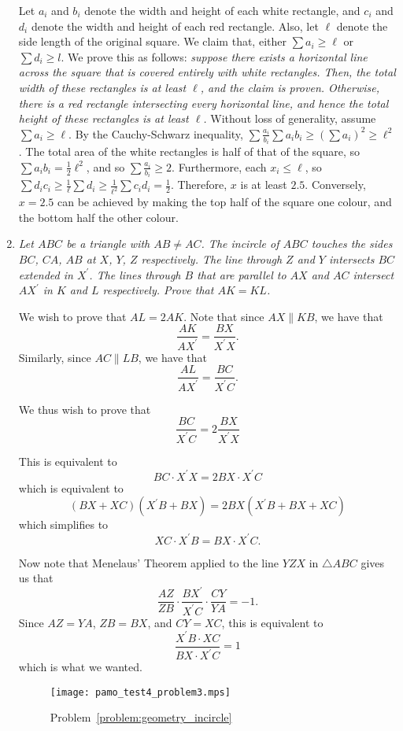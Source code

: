 \documentclass[a4paper, 12pt]{article}
\begin{document}
\begin{enumerate}
Let $a_i$ and $b_i$ denote the width and height of each white rectangle, and $c_i$ and $d_i$ denote the width and height of each red rectangle. Also, let $\ell$ denote the side length of the original square. We claim that, either $\sum a_i \geq \ell$ or $\sum d_i \geq l$. We prove this as follows: \textit{suppose there exists a horizontal line across the square that is covered entirely with white rectangles. Then, the total width of these rectangles is at least $\ell$, and the claim is proven. Otherwise, there is a red rectangle intersecting every horizontal line, and hence the total height of these rectangles is at least $\ell$.} Without loss of generality, assume $\sum a_i \geq \ell$. By the Cauchy-Schwarz inequality, $\sum \frac{a_i}{b_i} \sum{a_i b_i} \geq {(\sum a_i)}^2 \geq \ell^2$. The total area of the white rectangles is half of that of the square, so $\sum a_i b_i = \frac{1}{2} \ell^2$, and so $\sum \frac{a_i}{b_i} \geq 2$. Furthermore, each $x_i \leq \ell$, so $\sum{d_i}{c_i} \geq \frac{1}{\ell} \sum d_i \geq \frac{1}{\ell^2} \sum c_i d_i = \frac{1}{2}$. Therefore, $x$ is at least $2.5$. Conversely, $x = 2.5$ can be achieved by making the top half of the square one colour, and the bottom half the other colour.


\item\label{problem:geometry_incircle} %
{\itshape Let $ABC$ be a triangle with $AB \neq AC$. The incircle of $ABC$ touches the sides $BC$, $CA$, $AB$ at $X$, $Y$, $Z$ respectively. The line through $Z$ and $Y$ intersects $BC$ extended in $X^\prime$. The lines through $B$ that are parallel to $AX$ and $AC$ intersect $AX^\prime$ in $K$ and $L$ respectively. Prove that $AK = KL$.}

We wish to prove that $AL = 2AK$. Note that since $AX \parallel KB$, we have that
\[
  \frac{AK}{AX^\prime} = \frac{BX}{X^\prime X}.
\]
Similarly, since $AC \parallel LB$, we have that
\[
  \frac{AL}{AX^\prime} = \frac{BC}{X^\prime C}.
\]

We thus wish to prove that
\[
  \frac{BC}{X^\prime C} = 2 \frac{BX}{X^\prime X}
\]

This is equivalent to
\[
  BC \cdot X^\prime X = 2 BX \cdot X^\prime C
\]
which is equivalent to
\[
  (BX + XC) (X^\prime B + BX) = 2 BX (X^\prime B + BX + XC)
\]
which simplifies to
\[
  XC \cdot X^\prime B = BX \cdot X^\prime C.
\]

Now note that Menelaus' Theorem applied to the line $YZX$ in $\triangle ABC$ gives us that
\[
  \frac{AZ}{ZB} \cdot \frac{BX^\prime}{X^\prime C} \cdot \frac{CY}{YA} = -1.
\]
Since $AZ = YA$, $ZB = BX$, and $CY = XC$, this is equivalent to
\[
  \frac{X^\prime B \cdot XC}{BX \cdot X^\prime C} = 1
\]
which is what we wanted.

\begin{figure}[!ht]
\centering
\texttt{[image: pamo\_test4\_problem3.mps]}
\caption{Problem~\ref{problem:geometry_incircle}}\label{fig:geometry_incircle}
\end{figure}


\end{enumerate}
\end{document}
